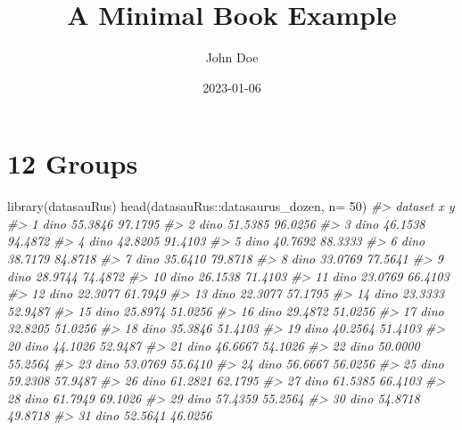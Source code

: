 \documentclass[
]{book}
\title{A Minimal Book Example}
\author{John Doe}
\date{2023-01-06}
\newenvironment{Shaded}{\begin{snugshade}}{\end{snugshade}}
\newcommand{\AttributeTok}[1]{\textcolor[rgb]{0.77,0.63,0.00}{#1}}
\newcommand{\CommentTok}[1]{\textcolor[rgb]{0.56,0.35,0.01}{\textit{#1}}}
\newcommand{\DecValTok}[1]{\textcolor[rgb]{0.00,0.00,0.81}{#1}}
\newcommand{\FunctionTok}[1]{\textcolor[rgb]{0.00,0.00,0.00}{#1}}
\newcommand{\NormalTok}[1]{#1}
\newcommand{\SpecialCharTok}[1]{\textcolor[rgb]{0.00,0.00,0.00}{#1}}
\theoremstyle{definition}
\theoremstyle{definition}
\theoremstyle{definition}
\theoremstyle{definition}
\theoremstyle{remark}
\begin{document}
\maketitle

{
\setcounter{tocdepth}{1}
\tableofcontents
}
\hypertarget{groups}{%
\chapter{12 Groups}\label{groups}}

\begin{Shaded}
\begin{Highlighting}[]
\FunctionTok{library}\NormalTok{(datasauRus)}
\FunctionTok{head}\NormalTok{(datasauRus}\SpecialCharTok{::}\NormalTok{datasaurus\_dozen, }\AttributeTok{n=} \DecValTok{50}\NormalTok{)}
\CommentTok{\#\textgreater{}    dataset       x       y}
\CommentTok{\#\textgreater{} 1     dino 55.3846 97.1795}
\CommentTok{\#\textgreater{} 2     dino 51.5385 96.0256}
\CommentTok{\#\textgreater{} 3     dino 46.1538 94.4872}
\CommentTok{\#\textgreater{} 4     dino 42.8205 91.4103}
\CommentTok{\#\textgreater{} 5     dino 40.7692 88.3333}
\CommentTok{\#\textgreater{} 6     dino 38.7179 84.8718}
\CommentTok{\#\textgreater{} 7     dino 35.6410 79.8718}
\CommentTok{\#\textgreater{} 8     dino 33.0769 77.5641}
\CommentTok{\#\textgreater{} 9     dino 28.9744 74.4872}
\CommentTok{\#\textgreater{} 10    dino 26.1538 71.4103}
\CommentTok{\#\textgreater{} 11    dino 23.0769 66.4103}
\CommentTok{\#\textgreater{} 12    dino 22.3077 61.7949}
\CommentTok{\#\textgreater{} 13    dino 22.3077 57.1795}
\CommentTok{\#\textgreater{} 14    dino 23.3333 52.9487}
\CommentTok{\#\textgreater{} 15    dino 25.8974 51.0256}
\CommentTok{\#\textgreater{} 16    dino 29.4872 51.0256}
\CommentTok{\#\textgreater{} 17    dino 32.8205 51.0256}
\CommentTok{\#\textgreater{} 18    dino 35.3846 51.4103}
\CommentTok{\#\textgreater{} 19    dino 40.2564 51.4103}
\CommentTok{\#\textgreater{} 20    dino 44.1026 52.9487}
\CommentTok{\#\textgreater{} 21    dino 46.6667 54.1026}
\CommentTok{\#\textgreater{} 22    dino 50.0000 55.2564}
\CommentTok{\#\textgreater{} 23    dino 53.0769 55.6410}
\CommentTok{\#\textgreater{} 24    dino 56.6667 56.0256}
\CommentTok{\#\textgreater{} 25    dino 59.2308 57.9487}
\CommentTok{\#\textgreater{} 26    dino 61.2821 62.1795}
\CommentTok{\#\textgreater{} 27    dino 61.5385 66.4103}
\CommentTok{\#\textgreater{} 28    dino 61.7949 69.1026}
\CommentTok{\#\textgreater{} 29    dino 57.4359 55.2564}
\CommentTok{\#\textgreater{} 30    dino 54.8718 49.8718}
\CommentTok{\#\textgreater{} 31    dino 52.5641 46.0256}

\end{Highlighting}
\end{Shaded}
\end{document}
